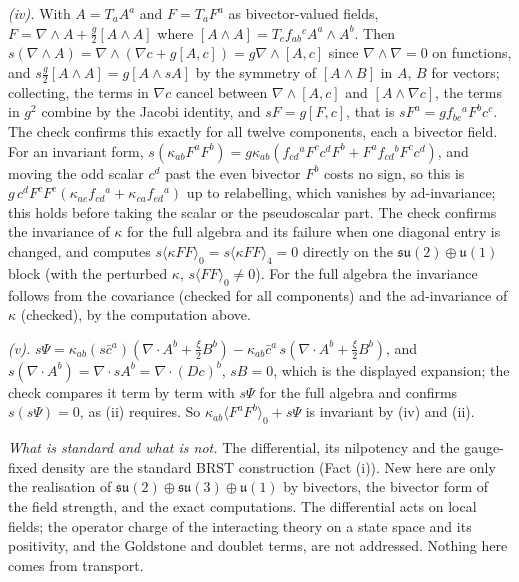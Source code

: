\emph{(iv).} With $A = T_aA^{a}$ and $F = T_aF^{a}$ as bivector-valued fields, $F = \nabla\wedge A + \tfrac{g}{2}[A\wedge A]$ where $[A\wedge A] = T_cf_{ab}{}^{c}A^{a}\wedge A^{b}$. Then $s(\nabla\wedge A) = \nabla\wedge(\nabla c + g[A, c]) = g\nabla\wedge[A, c]$ since $\nabla\wedge\nabla = 0$ on functions, and $s\tfrac{g}{2}[A\wedge A] = g[A\wedge sA]$ by the symmetry of $[A\wedge B]$ in $A$, $B$ for vectors; collecting, the terms in $\nabla c$ cancel between $\nabla\wedge[A, c]$ and $[A\wedge\nabla c]$, the terms in $g^2$ combine by the Jacobi identity, and $sF = g[F, c]$, that is $sF^{a} = gf_{bc}{}^{a}F^{b}c^{c}$. The check confirms this exactly for all twelve components, each a bivector field. For an invariant form, $s(\kappa_{ab}F^{a}F^{b}) = g\kappa_{ab}(f_{cd}{}^{a}F^{c}c^{d}F^{b} + F^{a}f_{cd}{}^{b}F^{c}c^{d})$, and moving the odd scalar $c^{d}$ past the even bivector $F^{b}$ costs no sign, so this is $g\,c^{d}F^{c}F^{e}(\kappa_{ae}f_{cd}{}^{a} + \kappa_{ca}f_{ed}{}^{a})$ up to relabelling, which vanishes by ad-invariance; this holds before taking the scalar or the pseudoscalar part. The check confirms the invariance of $\kappa$ for the full algebra and its failure when one diagonal entry is changed, and computes $s\langle\kappa FF\rangle_0 = s\langle\kappa FF\rangle_4 = 0$ directly on the $\mathfrak{su}(2) \oplus \mathfrak{u}(1)$ block (with the perturbed $\kappa$, $s\langle FF\rangle_0 \neq 0$). For the full algebra the invariance follows from the covariance (checked for all components) and the ad-invariance of $\kappa$ (checked), by the computation above.

\emph{(v).} $s\Psi = \kappa_{ab}(s\bar c^{a})(\nabla\cdot A^{b} + \tfrac{\xi}{2}B^{b}) - \kappa_{ab}\bar c^{a}\,s(\nabla\cdot A^{b} + \tfrac{\xi}{2}B^{b})$, and $s(\nabla\cdot A^{b}) = \nabla\cdot sA^{b} = \nabla\cdot(Dc)^{b}$, $sB = 0$, which is the displayed expansion; the check compares it term by term with $s\Psi$ for the full algebra and confirms $s(s\Psi) = 0$, as (ii) requires. So $\kappa_{ab}\langle F^{a}F^{b}\rangle_0 + s\Psi$ is invariant by (iv) and (ii).

\emph{What is standard and what is not.} The differential, its nilpotency and the gauge-fixed density are the standard BRST construction (Fact (i)). New here are only the realisation of $\mathfrak{su}(2) \oplus \mathfrak{su}(3) \oplus \mathfrak{u}(1)$ by bivectors, the bivector form of the field strength, and the exact computations. The differential acts on local fields; the operator charge of the interacting theory on a state space and its positivity, and the Goldstone and doublet terms, are not addressed. Nothing here comes from transport.
